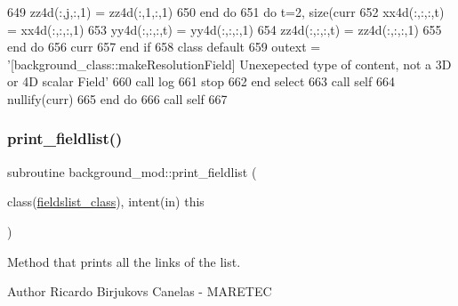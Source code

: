 \begin{DoxyCode}
649                     zz4d(:,j,:,1) = zz4d(:,1,:,1)
650 \textcolor{keywordflow}{                end do}
651                 \textcolor{keywordflow}{do} t=2, \textcolor{keyword}{size}(curr%
652                     xx4d(:,:,:,t) = xx4d(:,:,:,1)
653                     yy4d(:,:,:,t) = yy4d(:,:,:,1)
654                     zz4d(:,:,:,t) = zz4d(:,:,:,1)
655 \textcolor{keywordflow}{                end do}
656                 curr%
657 \textcolor{keywordflow}{            end if}
658 \textcolor{keywordflow}{            class default}
659             outext = \textcolor{stringliteral}{'[background\_class::makeResolutionField] Unexepected type of content, not a 3D or 4D
       scalar Field'}
660             \textcolor{keyword}{call }log%
661             stop
662 \textcolor{keywordflow}{        end select}
663         \textcolor{keyword}{call }self%
664         \textcolor{keyword}{nullify}(curr)
665 \textcolor{keywordflow}{    end do}
666     \textcolor{keyword}{call }self%
667 
\end{DoxyCode}
\mbox{\label{namespacebackground__mod_acdcc52b4fb298bc145a121f9e8a4b929}} 
\subsubsection{\texorpdfstring{print\+\_\+fieldlist()}{print\_fieldlist()}}
{\footnotesize\ttfamily subroutine background\+\_\+mod\+::print\+\_\+fieldlist (\begin{DoxyParamCaption}\item[{class(\mbox{\hyperlink{structbackground__mod_1_1fieldslist__class}{fieldslist\+\_\+class}}), intent(in)}]{this }\end{DoxyParamCaption})\hspace{0.3cm}{\ttfamily [private]}}



Method that prints all the links of the list. 

\begin{DoxyAuthor}{Author}
Ricardo Birjukovs Canelas -\/ M\+A\+R\+E\+T\+EC 
\end{DoxyAuthor}


